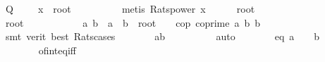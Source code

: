 \begin{isabellebody}
\ Q{\isacharcolon}{\kern0pt}\ {\isachardoublequoteopen}{}\ {\isacharplus}{\kern0pt}\ {}\ {\isacharasterisk}{\kern0pt}\ x\ {\isacharasterisk}{\kern0pt}\ root\ {}\ {}\ {\isasymin}\ {\isasymrat}{\isachardoublequoteclose}\isanewline
\ \ \ \ \isamarkupfalse%
\ {\isacharparenleft}{\kern0pt}metis\ Rats{\isacharunderscore}{\kern0pt}power\ {\isacartoucheopen}x\ {\isasymin}\ {\isasymrat}{\isacartoucheclose}{\isacharparenright}{\kern0pt}\isanewline
\ \ \isamarkupfalse%
\ {\isachardoublequoteopen}root\ {}\ {}\ {\isasymnotin}\ {\isasymrat}{\isachardoublequoteclose}\isanewline
\ \ \isamarkupfalse%
\ \isanewline
\ \ \ \ \isamarkupfalse%
\ {\isachardoublequoteopen}root\ {}\ {}\ {\isasymin}\ {\isasymrat}{\isachardoublequoteclose}\isanewline
\ \ \ \ \isamarkupfalse%
\ \isamarkupfalse%
\ a\ b\ \ {\isachardoublequoteopen}a\ {\isacharslash}{\kern0pt}\ b\ {\isacharequal}{\kern0pt}\ root\ {}\ {}{\isachardoublequoteclose}\ \ cop{\isacharcolon}{\kern0pt}\ {\isachardoublequoteopen}coprime\ a\ b{\isachardoublequoteclose}\ {\isachardoublequoteopen}b{\isasymnoteq}{}{\isachardoublequoteclose}\isanewline
\ \ \ \ \ \ \isamarkupfalse%
\ {\isacharparenleft}{\kern0pt}smt\ {\isacharparenleft}{\kern0pt}verit{\isacharcomma}{\kern0pt}\ best{\isacharparenright}{\kern0pt}\ Rats{\isacharunderscore}{\kern0pt}cases{\isacharprime}{\kern0pt}{\isacharparenright}{\kern0pt}\isanewline
\ \ \ \ \isamarkupfalse%
\ \isamarkupfalse%
\ {\isachardoublequoteopen}{\isacharparenleft}{\kern0pt}a{\isacharslash}{\kern0pt}b{\isacharparenright}{\kern0pt}{\isacharcircum}{\kern0pt}{}\ {\isacharequal}{\kern0pt}\ {}{\isachardoublequoteclose}\isanewline
\ \ \ \ \ \ \isamarkupfalse%
\ auto\isanewline
\ \ \ \ \isamarkupfalse%
\ \isamarkupfalse%
\ eq{\isacharcolon}{\kern0pt}\ {\isachardoublequoteopen}a{\isacharcircum}{\kern0pt}{}\ {\isacharequal}{\kern0pt}\ {}{\isacharasterisk}{\kern0pt}{}\ {\isacharasterisk}{\kern0pt}\ b{\isacharcircum}{\kern0pt}{}{\isachardoublequoteclose}\ \isanewline
\ \ \ \ \ \ \isamarkupfalse%
\ of{\isacharunderscore}{\kern0pt}int{\isacharunderscore}{\kern0pt}eq{\isacharunderscore}{\kern0pt}iff\ \isamarkupfalse%

\end{isabellebody}
